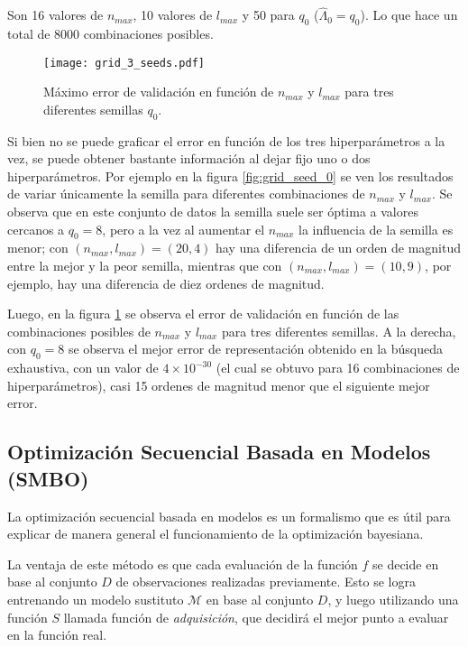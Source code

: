 Son 16 valores de $n_{max}$, 10 valores de $l_{max}$ y 50 para $q_0$ ($\hat{\Lambda}_0 = q_0$). Lo que hace un total de 8000 combinaciones posibles.



\begin{figure}[h!]
\centering
\texttt{[image: grid\_3\_seeds.pdf]}
\caption{Máximo error de validación en función de $n_{max}$ y $l_{max}$ para tres diferentes semillas $q_0$. }
\label{fig:grid_3_seeds}
\end{figure}

Si bien no se puede graficar el error en función de los tres hiperparámetros a la vez, se puede obtener bastante información al dejar fijo uno o dos hiperparámetros. Por ejemplo en la figura \ref{fig:grid_seed_0} se ven los resultados de variar únicamente la semilla para diferentes combinaciones de $n_{max}$ y $l_{max}$. Se observa que en este conjunto de datos la semilla suele ser óptima a valores cercanos a $q_0 = 8$, pero a la vez al aumentar el $n_{max}$ la influencia de la semilla es menor; con $(n_{max}, l_{max})=(20, 4)$ hay una diferencia de un orden de magnitud entre la mejor y la peor semilla, mientras que con $(n_{max}, l_{max})=(10, 9)$, por ejemplo, hay una diferencia de diez ordenes de magnitud.

Luego, en la figura \ref{fig:grid_3_seeds} se observa el error de validación en función de las combinaciones posibles de  $n_{max}$ y $l_{max}$ para tres diferentes semillas. A la derecha, con $q_0=8$ se observa el mejor error de representación obtenido en la búsqueda exhaustiva, con un valor de $4\times10^{-30}$ (el cual se obtuvo para 16 combinaciones de hiperparámetros), casi 15 ordenes de magnitud menor que el siguiente mejor error.


\subsection{Optimización Secuencial Basada en Modelos (SMBO)}


La optimización secuencial basada en modelos es un formalismo que es útil para explicar de manera general el funcionamiento de la optimización bayesiana.

La ventaja de este método es que cada evaluación de la función $f$ se decide en base al conjunto $D$ de observaciones realizadas previamente. Esto se logra entrenando un modelo sustituto $\mathcal{M}$ en base al conjunto $D$, y luego utilizando una función $S$ llamada función de \textit{adquisición}, que decidirá el mejor punto a evaluar en la función real.

